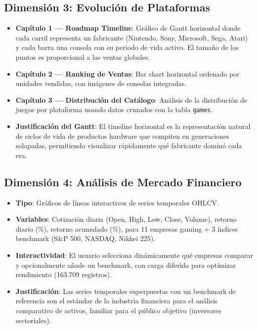 \documentclass[11pt,a4paper]{article}
\begin{document}
\subsection{Dimensión 3: Evolución de Plataformas}

\begin{itemize}
  \item \textbf{Capítulo 1 — Roadmap Timeline}: Gráfico de Gantt horizontal donde cada carril representa un fabricante (Nintendo, Sony, Microsoft, Sega, Atari) y cada barra una consola con su periodo de vida activo. El tamaño de los puntos es proporcional a las ventas globales.
  \item \textbf{Capítulo 2 — Ranking de Ventas}: Bar chart horizontal ordenado por unidades vendidas, con imágenes de consolas integradas.
  \item \textbf{Capítulo 3 — Distribución del Catálogo}: Análisis de la distribución de juegos por plataforma usando datos cruzados con la tabla \texttt{games}.
  \item \textbf{Justificación del Gantt}: El timeline horizontal es la representación natural de ciclos de vida de productos hardware que compiten en generaciones solapadas, permitiendo visualizar rápidamente qué fabricante dominó cada era.
\end{itemize}

\subsection{Dimensión 4: Análisis de Mercado Financiero}

\begin{itemize}
  \item \textbf{Tipo}: Gráficos de líneas interactivos de series temporales OHLCV.
  \item \textbf{Variables}: Cotización diaria (Open, High, Low, Close, Volume), retorno diario (\%), retorno acumulado (\%), para 11 empresas gaming + 3 índices benchmark (S\&P 500, NASDAQ, Nikkei 225).
  \item \textbf{Interactividad}: El usuario selecciona dinámicamente qué empresas comparar y opcionalmente añade un benchmark, con carga diferida para optimizar rendimiento (163.709 registros).
  \item \textbf{Justificación}: Las series temporales superpuestas con un benchmark de referencia son el estándar de la industria financiera para el análisis comparativo de activos, familiar para el público objetivo (inversores sectoriales).
\end{itemize}
\end{document}
